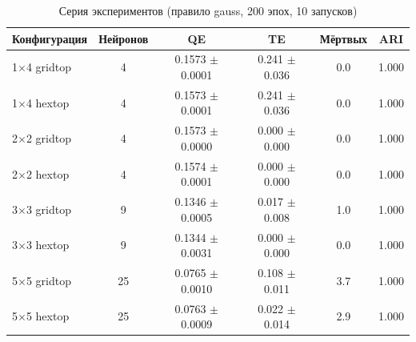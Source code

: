 \begin{table}[H]
\caption{Серия экспериментов (правило gauss, 200 эпох, 10 запусков)}
\label{tab:series}
\centering
\small
\begin{tabular}{lccccc}
\toprule
Конфигурация & Нейронов & QE & TE & Мёртвых & ARI \\
\midrule
1$\times$4 gridtop & 4 & 0.1573 $\pm$ 0.0001 & 0.241 $\pm$ 0.036 & 0.0 & 1.000 \\
1$\times$4 hextop & 4 & 0.1573 $\pm$ 0.0001 & 0.241 $\pm$ 0.036 & 0.0 & 1.000 \\
2$\times$2 gridtop & 4 & 0.1573 $\pm$ 0.0000 & 0.000 $\pm$ 0.000 & 0.0 & 1.000 \\
2$\times$2 hextop & 4 & 0.1574 $\pm$ 0.0001 & 0.000 $\pm$ 0.000 & 0.0 & 1.000 \\
3$\times$3 gridtop & 9 & 0.1346 $\pm$ 0.0005 & 0.017 $\pm$ 0.008 & 1.0 & 1.000 \\
3$\times$3 hextop & 9 & 0.1344 $\pm$ 0.0031 & 0.000 $\pm$ 0.000 & 0.0 & 1.000 \\
5$\times$5 gridtop & 25 & 0.0765 $\pm$ 0.0010 & 0.108 $\pm$ 0.011 & 3.7 & 1.000 \\
5$\times$5 hextop & 25 & 0.0763 $\pm$ 0.0009 & 0.022 $\pm$ 0.014 & 2.9 & 1.000 \\
\bottomrule
\end{tabular}
\end{table}
